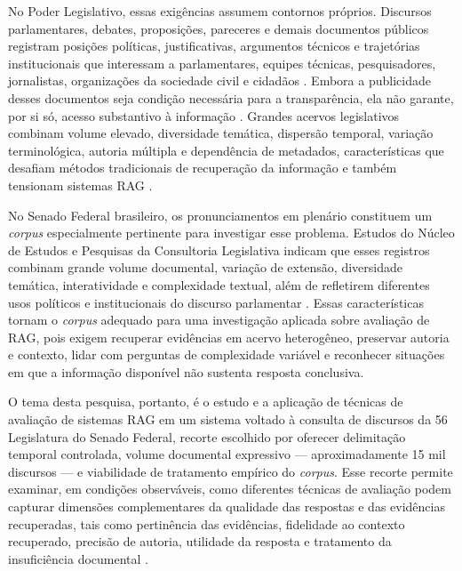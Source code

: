 No Poder Legislativo, essas exigências assumem contornos próprios. Discursos parlamentares, debates, proposições, pareceres e demais documentos públicos registram posições políticas, justificativas, argumentos técnicos e trajetórias institucionais que interessam a parlamentares, equipes técnicas, pesquisadores, jornalistas, organizações da sociedade civil e cidadãos \parencite{geunis2023parliamentaryMonitoring,skubicFiser2024discourseReview}. Embora a publicidade desses documentos seja condição necessária para a transparência, ela não garante, por si só, acesso substantivo à informação \parencite{bandeiraBernardes2016information}. Grandes acervos legislativos combinam volume elevado, diversidade temática, dispersão temporal, variação terminológica, autoria múltipla e dependência de metadados, características que desafiam métodos tradicionais de recuperação da informação e também tensionam sistemas RAG \parencite{manningEtAl2008informationRetrieval,skubicFiser2024discourseReview,martelloteViola2025organizacaoConhecimento}.

No Senado Federal brasileiro, os pronunciamentos em plenário constituem um \textit{corpus} especialmente pertinente para investigar esse problema. Estudos do Núcleo de Estudos e Pesquisas da Consultoria Legislativa indicam que esses registros combinam grande volume documental, variação de extensão, diversidade temática, interatividade e complexidade textual, além de refletirem diferentes usos políticos e institucionais do discurso parlamentar \parencite{blanco2025plenarioPalanqueEstudio,blanco2026letrasGraudas}. Essas características tornam o \textit{corpus} adequado para uma investigação aplicada sobre avaliação de RAG, pois exigem recuperar evidências em acervo heterogêneo, preservar autoria e contexto, lidar com perguntas de complexidade variável e reconhecer situações em que a informação disponível não sustenta resposta conclusiva.

O tema desta pesquisa, portanto, é o estudo e a aplicação de técnicas de avaliação de sistemas RAG em um sistema voltado à consulta de discursos da 56\textordfeminine{} Legislatura do Senado Federal, recorte escolhido por oferecer delimitação temporal controlada, volume documental expressivo --- aproximadamente 15 mil discursos --- e viabilidade de tratamento empírico do \textit{corpus}. Esse recorte permite examinar, em condições observáveis, como diferentes técnicas de avaliação podem capturar dimensões complementares da qualidade das respostas e das evidências recuperadas, tais como pertinência das evidências, fidelidade ao contexto recuperado, precisão de autoria, utilidade da resposta e tratamento da insuficiência documental \parencite{esEtAl2023ragas,saadFalconEtAl2024ares,pipitoneAlami2024legalbenchRag}.

